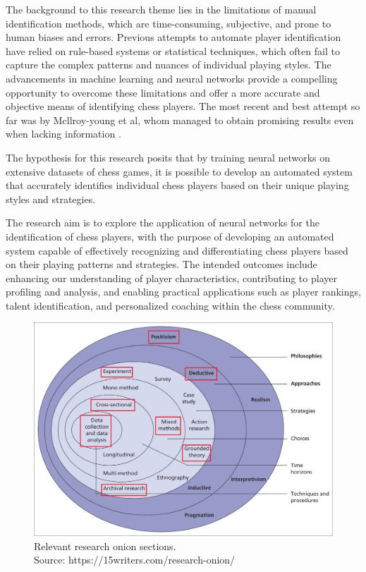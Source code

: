 \begin{spacing}{2.0}
The background to this research theme lies in the limitations of manual identification methods, which are time-consuming, subjective, and prone to human biases and errors. Previous attempts to automate player identification have relied on rule-based systems or statistical techniques, which often fail to capture the complex patterns and nuances of individual playing styles. The advancements in machine learning and neural networks provide a compelling opportunity to overcome these limitations and offer a more accurate and objective means of identifying chess players. The most recent and best attempt so far was by Mcllroy-young et al, whom managed to obtain promising results even when lacking information \cite{stylometryChess}.

The hypothesis for this research posits that by training neural networks on extensive datasets of chess games, it is possible to develop an automated system that accurately identifies individual chess players based on their unique playing styles and strategies.

The research aim is to explore the application of neural networks for the identification of chess players, with the purpose of developing an automated system capable of effectively recognizing and differentiating chess players based on their playing patterns and strategies. The intended outcomes include enhancing our understanding of player characteristics, contributing to player profiling and analysis, and enabling practical applications such as player rankings, talent identification, and personalized coaching within the chess community.

\begin{figure}[ht]
\centering
\includegraphics[scale=0.15]{Figures/Research-Onion.jpg}
\caption{Relevant research onion sections.\\Source: https://15writers.com/research-onion/}
\label{fig:Onion} 
\end{figure}

\end{spacing}

\newpage


